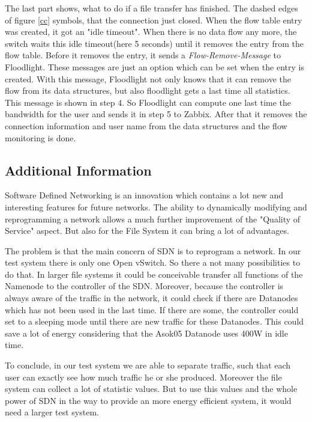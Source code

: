 The last part shows, what to do if a file transfer has finished. The dashed edges of figure \ref{cc} symbols, that the connection just closed. When the flow table entry was created, it got an "idle timeout"\cite[p. 11]{ofspec}. When there is no data flow any more, the switch waits this idle timeout(here 5 seconds) until it removes the entry from the flow table. Before it removes the entry, it sends a \textit{Flow-Remove-Message}\cite[p. 37]{ofspec} to Floodlight. These messages are just an option which can be set when the entry is created. With this message, Floodlight not only knows that it can remove the flow from its data structures, but also floodlight gets a last time all statistics. This message is shown in step 4. So Floodlight can compute one last time the bandwidth for the user and sends it in step 5 to Zabbix. After that it removes the connection information and user name from the data structures and the flow monitoring is done.

\subsection{Additional Information}

Software Defined Networking is an innovation which contains a lot new and interesting features for future networks. The ability to dynamically modifying and reprogramming a network allows a much further improvement of the "Quality of Service" aspect. But also for the File System it can bring a lot of advantages.

The problem is that the main concern of SDN is to reprogram a network. In our test system there is only one Open vSwitch. So there a not many possibilities to do that. In larger file systems it could be conceivable transfer all functions of the Namenode to the controller of the SDN. Moreover, because the controller is always aware of the traffic in the network, it could check if there are Datanodes which has not been used in the last time. If there are some, the controller could set to a sleeping mode until there are new traffic for these Datanodes. This could save a lot of energy considering that the Asok05 Datanode uses 400W in idle time. 

To conclude, in our test system we are able to separate traffic, such that each user can exactly see how much traffic he or she produced. Moreover the file system can collect a lot of statistic values. But to use this values and the whole power of SDN in the way to provide an more energy efficient system, it would need a larger test system.  
